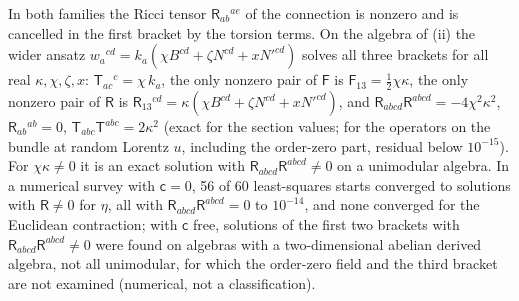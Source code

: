 In both families the Ricci tensor \(\mathsf R_{ab}{}^{ae}\) of the connection is nonzero and is cancelled in the first bracket by the torsion terms. On the algebra of (ii) the wider ansatz \(w_a{}^{cd}=k_a(\chi B^{cd}+\zeta N^{cd}+xN'^{cd})\) solves all three brackets for all real \(\kappa,\chi,\zeta,x\): \(\mathsf T_{ac}{}^c=\chi\,k_a\), the only nonzero pair of \(\mathsf F\) is \(\mathsf F_{13}=\tfrac12\chi\kappa\), the only nonzero pair of \(\mathsf R\) is \(\mathsf R_{13}{}^{cd}=\kappa(\chi B^{cd}+\zeta N^{cd}+xN'^{cd})\), and \(\mathsf R_{abcd}\mathsf R^{abcd}=-4\chi^2\kappa^2\), \(\mathsf R_{ab}{}^{ab}=0\), \(\mathsf T_{abc}\mathsf T^{abc}=2\kappa^2\) (exact for the section values; for the operators on the bundle at random Lorentz \(u\), including the order-zero part, residual below \(10^{-15}\)). For \(\chi\kappa\neq0\) it is an exact solution with \(\mathsf R_{abcd}\mathsf R^{abcd}\neq0\) on a unimodular algebra. In a numerical survey with \(\mathsf c=0\), 56 of 60 least-squares starts converged to solutions with \(\mathsf R\neq0\) for \(\eta\), all with \(\mathsf R_{abcd}\mathsf R^{abcd}=0\) to \(10^{-14}\), and none converged for the Euclidean contraction; with \(\mathsf c\) free, solutions of the first two brackets with \(\mathsf R_{abcd}\mathsf R^{abcd}\neq0\) were found on algebras with a two-dimensional abelian derived algebra, not all unimodular, for which the order-zero field and the third bracket are not examined (numerical, not a classification).

